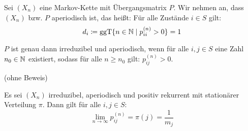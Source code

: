 \documentclass[a4paper,twoside,DIV15,BCOR12mm]{scrbook}
\begin{document}
Sei $(X_n)$ eine Markov-Kette mit Übergangsmatrix $P$. Wir nehmen an, dass $(X_n)$ bzw. $P$ aperiodisch ist, das heißt: Für alle Zustände $i\in S$ gilt: 
\[
d_i \da \operatorname{ggT}\{n\in \MdN \mid p_{ii}^{(n)}>0 \} = 1
\]

\begin{lemma}
\label{lem4.1}
$P$ ist genau dann irreduzibel und aperiodisch, wenn für alle $i,j\in S$ eine Zahl $n_0\in\mathbb{N}$ existiert, sodass für alle $n\ge n_0$ gilt: $p_{ij}^{(n)}>0$.
\end{lemma}

(ohne Beweis)

\begin{satz}[Konvergenzsatz]
Es sei $(X_n)$ irreduzibel, aperiodisch und positiv rekurrent mit stationärer Verteilung $\pi$. Dann gilt für alle $i,j\in S$:
\[
\lim_{n\to\infty} p_{ij}^{(n)} = \pi(j) = \frac1{m_j}
\]
\end{satz}
\end{document}
